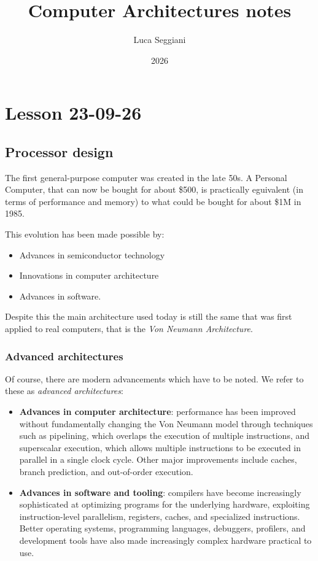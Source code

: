 \documentclass[a4paper,11pt]{article}
\title{Computer Architectures notes}
\author{Luca Seggiani}
\date{2026}
\begin{document}
\section{Lesson 23-09-26}

\thispagestyle{empty}
\pagestyle{fancy}


\subsection{Processor design}

The first general-purpose computer was created in the late 50s.
A Personal Computer, that can now be bought for about \$500, is practically eguivalent (in terms of performance and memory) to what could be bought for about \$1M in 1985.

This evolution has been made possible by:
\begin{itemize}
\item Advances in semiconductor technology
\item Innovations in computer architecture
\item Advances in software.
\end{itemize}

Despite this the main architecture used today is still the same that was first applied to real computers, that is the \textit{Von Neumann Architecture}.

\subsubsection{Advanced architectures}

Of course, there are modern advancements which have to be noted.
We refer to these as \textit{advanced architectures}:
\begin{itemize}
	\item \textbf{Advances in computer architecture}: performance has been improved without fundamentally changing the Von Neumann model through techniques such as pipelining, which overlaps the execution of multiple instructions, and superscalar execution, which allows multiple instructions to be executed in parallel in a single clock cycle. Other major improvements include caches, branch prediction, and out-of-order execution.
	\item \textbf{Advances in software and tooling}: compilers have become increasingly sophisticated at optimizing programs for the underlying hardware, exploiting instruction-level parallelism, registers, caches, and specialized instructions. Better operating systems, programming languages, debuggers, profilers, and development tools have also made increasingly complex hardware practical to use.
\end{itemize}
\end{document}
